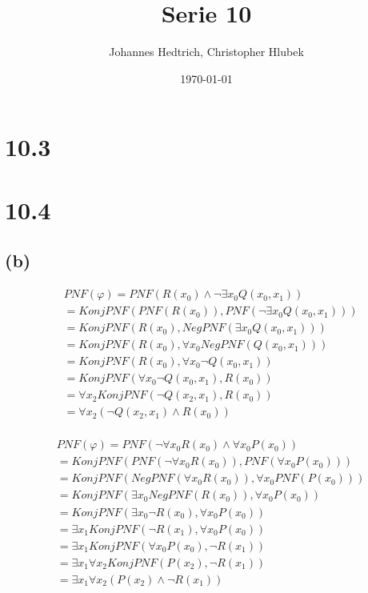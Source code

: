 \documentclass[12pt,a4paper]{scrartcl}
\title{Serie 10}
\author{Johannes Hedtrich, Christopher Hlubek}
\date{\today}
\begin{document}
  \section*{10.3}
  
  \section*{10.4}
  
  \subsection*{(b)}
    \begin{align*}
      & PNF(\varphi) = PNF(R(x_0) \wedge \neg \exists x_0 Q(x_0, x_1))\\
      &= KonjPNF(PNF(R(x_0)), PNF(\neg \exists x_0 Q(x_0, x_1)))\\
      &= KonjPNF(R(x_0), NegPNF(\exists x_0 Q(x_0, x_1)))\\
      &= KonjPNF(R(x_0), \forall x_0 NegPNF(Q(x_0, x_1)))\\
      &= KonjPNF(R(x_0), \forall x_0 \neg Q(x_0, x_1))\\
      &= KonjPNF(\forall x_0 \neg Q(x_0, x_1), R(x_0))\\
      &= \forall x_2 KonjPNF(\neg Q(x_2, x_1), R(x_0))\\
      &= \forall x_2 (\neg Q(x_2, x_1) \wedge R(x_0))\\
  \end{align*}

  \begin{align*}
      & PNF(\varphi) = PNF(\neg \forall x_0 R(x_0) \wedge \forall x_0 P(x_0))\\
      &= KonjPNF(PNF(\neg \forall x_0 R(x_0)), PNF(\forall x_0 P(x_0)))\\
      &= KonjPNF(NegPNF(\forall x_0 R(x_0)), \forall x_0 PNF(P(x_0)))\\
      &= KonjPNF(\exists x_0 NegPNF(R(x_0)), \forall x_0 P(x_0))\\
      &= KonjPNF(\exists x_0 \neg R(x_0), \forall x_0 P(x_0))\\
      &= \exists x_1 KonjPNF(\neg R(x_1), \forall x_0 P(x_0))\\
      &= \exists x_1 KonjPNF(\forall x_0 P(x_0), \neg R(x_1))\\
      &= \exists x_1 \forall x_2 KonjPNF(P(x_2), \neg R(x_1))\\
      &= \exists x_1 \forall x_2 (P(x_2) \wedge \neg R(x_1))\\
  \end{align*}
  
\end{document}
